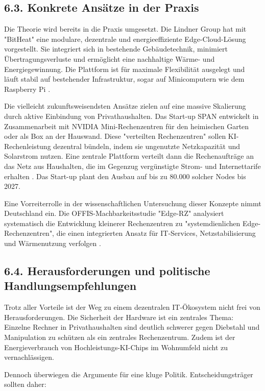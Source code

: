 \documentclass[12pt, a4paper]{article}
\begin{document}
	\subsection*{6.3. Konkrete Ansätze in der Praxis}
	Die Theorie wird bereits in die Praxis umgesetzt. Die Lindner Group hat mit "BitHeat" eine
	modulare, dezentrale und energieeffiziente Edge-Cloud-Lösung vorgestellt. Sie integriert
	sich in bestehende Gebäudetechnik, minimiert Übertragungsverluste und ermöglicht eine
	nachhaltige Wärme- und Energiegewinnung. Die Plattform ist für maximale Flexibilität
	ausgelegt und läuft stabil auf bestehender Infrastruktur, sogar auf Minicomputern wie dem
	Raspberry Pi \cite{lindner2025}.
	
	Die vielleicht zukunftsweisendsten Ansätze zielen auf eine massive Skalierung durch aktive
	Einbindung von Privathaushalten. Das Start-up SPAN entwickelt in Zusammenarbeit mit NVIDIA
	Mini-Rechenzentren für den heimischen Garten oder als Box an der Hauswand. Diese
	"verteilten Rechenzentren" sollen KI-Rechenleistung dezentral bündeln, indem sie ungenutzte
	Netzkapazität und Solarstrom nutzen. Eine zentrale Plattform verteilt dann die Rechenaufträge
	an das Netz aus Haushalten, die im Gegenzug vergünstigte Strom- und Internettarife erhalten
	\cite{heise2026, itboltwise2026, futurezone2026}. Das Start-up plant den Ausbau auf bis zu
	80.000 solcher Nodes bis 2027.
	
	Eine Vorreiterrolle in der wissenschaftlichen Untersuchung dieser Konzepte nimmt Deutschland
	ein. Die OFFIS-Machbarkeitsstudie "Edge-RZ" analysiert systematisch die Entwicklung kleinerer
	Rechenzentren zu "systemdienlichen Edge-Rechenzentren", die einen integrierten Ansatz für
	IT-Services, Netzstabilisierung und Wärmenutzung verfolgen \cite{offis2025}.
	
	\subsection*{6.4. Herausforderungen und politische Handlungsempfehlungen}
	Trotz aller Vorteile ist der Weg zu einem dezentralen IT-Ökosystem nicht frei von
	Herausforderungen. Die Sicherheit der Hardware ist ein zentrales Thema: Einzelne Rechner
	in Privathaushalten sind deutlich schwerer gegen Diebstahl und Manipulation zu schützen als
	ein zentrales Rechenzentrum. Zudem ist der Energieverbrauch von Hochleistungs-KI-Chips im
	Wohnumfeld nicht zu vernachlässigen.
	
	Dennoch überwiegen die Argumente für eine kluge Politik. Entscheidungsträger sollten daher:
	
\end{document}
